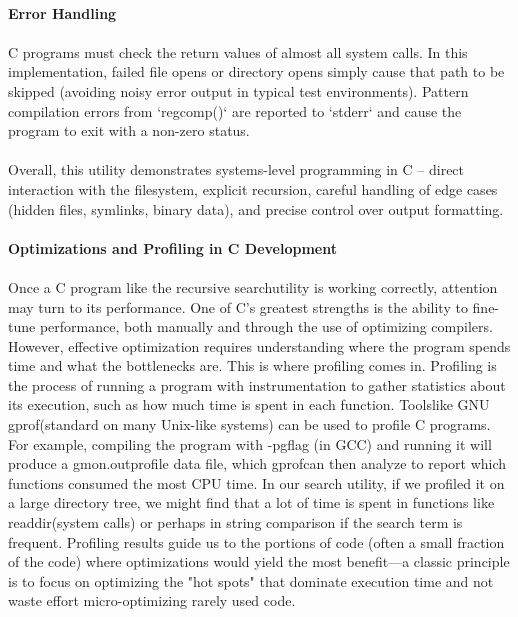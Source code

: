 \documentclass{article}
\begin{document}
\\
{\large \textbf{Error Handling}}\\
\\
{\normalsize C programs must check the return values of almost all system calls. In this implementation, failed file opens or directory opens simply cause that path to be skipped (av}{\normalsize oiding noisy error output in typical test environments). Pattern compilation errors from `}{\normalsize regcomp}{\normalsize (}{\normalsize )` are reported to `stderr` and cause the program to exit with a non-zero status.}\\
\\
{\normalsize Overall, this utility demonstrates systems-level programming in C – direct }{\normalsize interaction with the filesystem, explicit recursion, careful handling of edge cases (hidden files, }{\normalsize symlinks}{\normalsize , binary data), and precise control over output formatting.}\\
\\
{\Large \textbf{Optimizations and Profiling in C Development}}\\
\\
{\normalsize Once a C program like the recursive search}{\normalsize  utility is working correctly, attention may turn to its performance. One of C's greatest strengths is the ability to fine-tune performance, both manually and through the use of optimizing compilers. However, effective optimization requires understanding w}{\normalsize here the program spends time and what the bottlenecks are. This is where profiling comes in. Profiling is the process of running a program with instrumentation to gather statistics about its execution, such as how much time is spent in each function. Tools}{\normalsize  like GNU }{\normalsize gprof}{\normalsize  (standard on many Unix-like systems) can be used to profile C programs. For example, compiling the program with -}{\normalsize pg}{\normalsize  flag (in GCC) and running it will produce a }{\normalsize gmon.out}{\normalsize  profile data file, which }{\normalsize gprof}{\normalsize  can then analyze to report which functio}{\normalsize ns consumed the most CPU time. In our search utility, if we profiled it on a large directory tree, we might find that a lot of time is spent in functions like }{\normalsize readdir}{\normalsize  (system calls) or perhaps in string comparison if the search term is frequent. Profiling }{\normalsize results guide us to the portions of code (often a small fraction of the code) where optimizations would yield the most benefit—a classic principle is to focus on optimizing the "hot spots" that dominate execution time and not waste effort micro-optimizing }{\normalsize rarely used code.}\\
\end{document}

